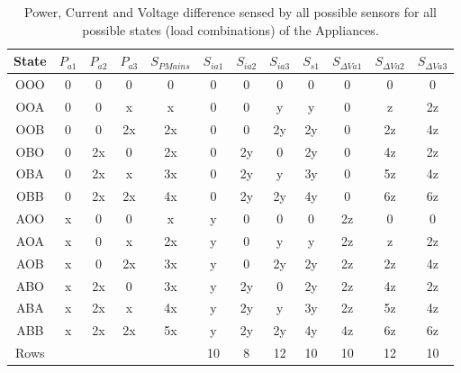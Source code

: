 \begin{table}[htb]
	\centering
	\caption{Power, Current and Voltage difference sensed by all possible sensors for all possible states (load combinations) of the Appliances.}
	\begin{tabular}{@{}cccccccccccc@{}}
		State  &  $P_{a1}$  &  $P_{a2}$   &  $P_{a3}$   &  $S_{PMains}$  &  $S_{ia1}$  &  $S_{ia2}$   &  $S_{ia3}$   &  $S_{s1}$   &  $ S_{\Delta Va1}$  &  $S_{\Delta Va2}$  &  $S_{\Delta V a3}$ \\
	\midrule
		OOO  &  0  &   0  &   0  &  \cellcolor{green!20}0  &  0  &   0  &   0  &   0  &   0  &   0  &   0 \\
		OOA  &  0  &   0  &   x  &  \cellcolor{green!20}x  &  0  &   0  &   y  &   y  &   0  &   z  &  2z \\
		OOB  &  0  &   0  &  2x  &  \cellcolor{green!20}2x  &  0  &   0  &  2y  &  2y  &   0  &  2z  &  4z \\
		OBO  &  0  &  2x  &   0  &  \cellcolor{green!20}2x  &  0  &  2y  &   0  &  2y  &   0  &  4z  &  2z \\
		OBA  &  0  &  2x  &   x  &  \cellcolor{green!20}3x  &  0  &  2y  &   y  &  3y  &   0  &  5z  &  4z \\
		OBB  &  0  &  2x  &  2x  &  \cellcolor{green!20}4x  &  0  &  2y  &  2y  &  4y  &   0  &  6z  &  6z \\
		AOO  &  x  &   0  &   0  &  \cellcolor{green!20}x  &  y  &   0  &   0  &   0  &  2z  &   0  &   0 \\
		AOA  &  x  &   0  &   x  &  \cellcolor{green!20}2x  &  y  &   0  &   y  &   y  &  2z  &   z  &  2z \\
		AOB  &  x  &   0  &  2x  &  \cellcolor{green!20}3x  &  y  &   0  &  2y  &  2y  &  2z  &  2z  &  4z \\
		ABO  &  x  &  2x  &   0  &  \cellcolor{green!20}3x  &  y  &  2y  &   0  &  2y  &  2z  &  4z  &  2z \\
		ABA  &  x  &  2x  &   x  &  \cellcolor{green!20}4x  &  y  &  2y  &   y  &  3y  &  2z  &  5z  &  4z \\
		ABB  &  x  &  2x  &  2x  &  \cellcolor{green!20}5x  &  y  &  2y  &  2y  &  4y  &  4z  &  6z  &  6z \\
		Rows &   &   &   &   &   10  &  8   &  12    &   10    &   10     &   12     &   10 \\
	\bottomrule
	\end{tabular}
	\label{tab:sensorTable}
\end{table}
